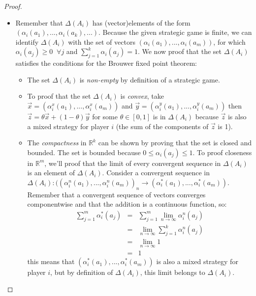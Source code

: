 \documentclass[a4paper,11pt]{article}
\newcommand{\R}{{\mathbb R}}
\begin{document}
\begin{proof}
\begin{itemize}
  \item Remember that $\Delta(A_i)$ has (vector)elements of the form $(\alpha_i(a_1),...,\alpha_i(a_k),...)$. Because the given strategic game is finite, we can identify $\Delta(A_i)$ with the set of vectors $(\alpha_i(a_1),...,\alpha_i(a_m))$, for which $\alpha_i(a_j) \geq 0 \;\; \forall j$ and $\sum^k_{j=1}{\alpha_i(a_j)} = 1$. We now proof that the set $\Delta(A_i)$ satisfies the conditions for the Brouwer fixed point theorem:
      \begin{itemize}
        \item The set $\Delta(A_i)$ is \emph{non-empty} by definition of a strategic game.
        \item To proof that the set $\Delta(A_i)$ is \emph{convex}, take $\vec{x} = (\alpha^x_i(a_1),...,\alpha^x_i(a_m))$ and $\vec{y} = (\alpha^y_i(a_1),...,\alpha^y_i(a_m))$ then $\vec{z} = \theta\vec{x} + (1 - \theta)\vec{y}$ for some $\theta \in [0,1]$ is in $\Delta(A_i)$ because $\vec{z}$ is also a mixed strategy for player $i$ (the sum of the components of $\vec{z}$ is 1).
        \item  The \emph{compactness} in $\R^k$ can be shown by proving that the set is closed and bounded. The set is bounded because $0 \leq \alpha_i(a_j) \leq 1$. To proof closeness in $\R^m$, we'll proof that the limit of every convergent sequence in $\Delta(A_i)$ is an element of $\Delta(A_i)$. Consider a convergent sequence in $\Delta(A_i): ((\alpha^n_i(a_1),...,\alpha^n_i(a_m))_n\rightarrow(\alpha^*_i(a_1),...,\alpha^*_i(a_m))$. Remember that a convergent sequence of vectors converges componentwise and that the addition is a continuous function, so:
            \begin{eqnarray*}
              \sum_{j=1}^m{\alpha^*_i(a_j)}  &=& \displaystyle\sum_{j=1}^m{\lim_{n\rightarrow\infty}{\alpha^n_i(a_j)}}\\
              &=& \displaystyle\lim_{n\rightarrow\infty}{\sum_{j=1}^k\alpha^n_i(a_j)}\\
              &=& \displaystyle\lim_{n\rightarrow\infty}{1}\\
              &=& 1
            \end{eqnarray*}
            this means that $(\alpha^*_i(a_1),...,\alpha^*_i(a_m))$ is also a mixed strategy for player $i$, but by definition of $\Delta(A_i)$, this limit belongs to $\Delta(A_i)$.
      \end{itemize}

\end{itemize}


\end{proof}
\end{document}
